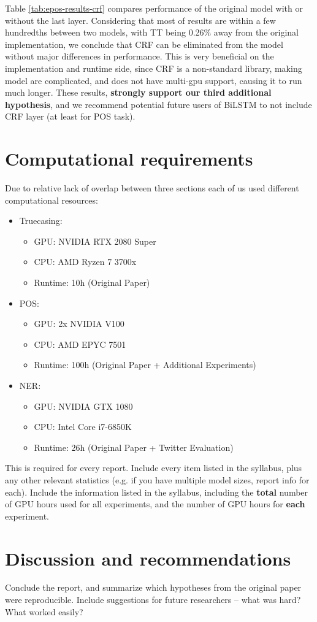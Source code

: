 \documentclass[11pt,a4paper]{article}
\begin{document}
    Table \ref{tab:epos-results-crf} compares performance of the original model with or without the last layer. Considering that most of results are within a few hundredths between two models, with TT being 0.26\% away from the original implementation, we conclude that CRF can be eliminated from the model without major differences in performance. This is very beneficial on the implementation and runtime side, since CRF is a non-standard library, making model are complicated, and does not have multi-gpu support, causing it to run much longer. These results, \textbf{strongly support our third additional hypothesis}, and we recommend potential future users of BiLSTM to not include CRF layer (at least for POS task).

\section{Computational requirements}
Due to relative lack of overlap between three sections each of us used different computational resources:
\begin{itemize}
    \item Truecasing:
    \begin{itemize}
        \item GPU: NVIDIA RTX 2080 Super
        \item CPU: AMD Ryzen 7 3700x
        \item Runtime: 10h (Original Paper)
    \end{itemize}
    \item POS:
    \begin{itemize}
        \item GPU: 2x NVIDIA V100
        \item CPU: AMD EPYC 7501
        \item Runtime: 100h (Original Paper + Additional Experiments)
    \end{itemize}
    \item NER:
    \begin{itemize}
        \item GPU: NVIDIA GTX 1080
        \item CPU: Intel Core i7-6850K
        \item Runtime: 26h (Original Paper + Twitter Evaluation)
    \end{itemize}
\end{itemize}

This is required for every report. Include every item listed in the syllabus, plus any other relevant statistics (e.g. if you have multiple model sizes, report info for each).
Include the information listed in the syllabus, including the \textbf{total} number of GPU hours used for all experiments, and the number of GPU hours for \textbf{each} experiment.

\section{Discussion and recommendations}
Conclude the report, and summarize which hypotheses from the original paper were reproducible. Include suggestions for future researchers -- what was hard? What worked easily?



\end{document}
